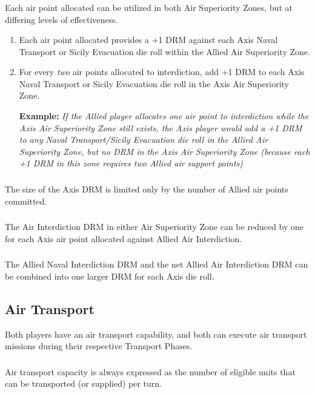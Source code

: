 \subsubsection{}
Each air point allocated can be utilized in both Air Superiority Zones, but at differing levels of effectiveness.

\begin{enumerate}[label=\alph*.]
    \item Each air point allocated provides a +1 DRM against each Axis Naval Transport or Sicily Evacuation die roll within the Allied Air Superiority Zone.
    \item For every \textit{two} air points allocated to interdiction, add +1 DRM to each Axis Naval Transport or Sicily Evacuation die roll in the Axis Air Superiority Zone.
    
    \textbf{Example:} \textit{If the Allied player allocates one air point to interdiction while the Axis Air Superiority Zone still exists, the Axis player would add a +1 DRM to any Naval Transport/Sicily Evacuation die roll in the Allied Air Superiority Zone, but no DRM in the Axis Air Superiority Zone (because each +1 DRM in this zone requires two Allied air support points)}
\end{enumerate}

\subsubsection{}
The size of the Axis DRM is limited only by the number of Allied air points committed.

\subsubsection{}
The Air Interdiction DRM in either Air Superiority Zone can be reduced by one for each Axis air point allocated against Allied Air Interdiction.

\subsubsection{}
The Allied Naval Interdiction DRM and the net Allied Air Interdiction DRM can be combined into one larger DRM for each Axis die roll.

\subsection{Air Transport}
Both players have an air transport capability, and both can execute air transport missions during their respective Transport Phases.

\subsubsection{}
Air transport capacity is always expressed as the number of eligible units that can be transported (or supplied) per turn.